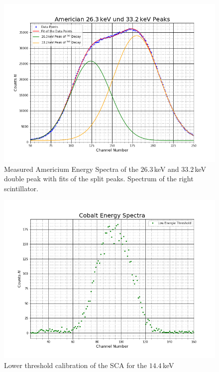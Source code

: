 \documentclass[30pt,a4paper]{article}
\begin{document}
	\begin{figure}[h]
		\includegraphics[scale=0.5]{Bilder/kleine_Peaks1}
		\centering
		\caption[Americium Spectra Double Peak Right Detector Side]{Measured Americium Energy Spectra of the $26.3$\,keV and $33.2$\,keV double peak with fits of the split peaks. Spectrum of the right scintillator.}
		\label{ASR}
	\end{figure}
	\begin{figure}
		\includegraphics[scale=0.5]{Bilder/LowThresh}
		\centering
		\caption{Lower threshold calibration of the SCA for the $14.4\,$keV}
		\label{low}
	\end{figure}
\end{document}
